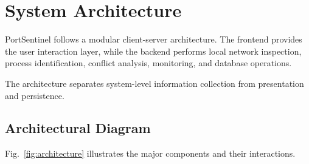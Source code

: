 \documentclass[conference]{IEEEtran}
\begin{document}
\section{System Architecture}

PortSentinel follows a modular client-server architecture.
The frontend provides the user interaction layer, while
the backend performs local network inspection, process
identification, conflict analysis, monitoring, and
database operations.

The architecture separates system-level information
collection from presentation and persistence.

\subsection{Architectural Diagram}

Fig.~\ref{fig:architecture} illustrates the major
components and their interactions.
\end{document}
